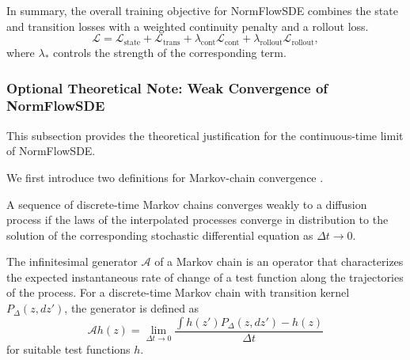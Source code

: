 In summary, the overall training objective for NormFlowSDE combines the state and transition losses with a weighted continuity penalty and a rollout loss.
\begin{equation}\label{eq:normflowsde_loss}
    \mathcal{L}
    =
    \mathcal{L}_{\text{state}} + \mathcal{L}_{\text{trans}}
    + \lambda_{\text{cont}} \mathcal{L}_{\text{cont}} 
    + \lambda_{\text{rollout}} \mathcal{L}_{\text{rollout}},
\end{equation}
where $\lambda_{*}$ controls the strength of the corresponding term.

\subsubsection{Optional Theoretical Note: Weak Convergence of NormFlowSDE}
This subsection provides the theoretical justification for the continuous-time limit of NormFlowSDE.

We first introduce two definitions for Markov-chain convergence \citep{billingsley1999convergence,EthierKurtz1986}.
\begin{definition}
    A sequence of discrete-time Markov chains converges weakly to a diffusion process if the laws of the interpolated processes converge in distribution to the solution of the corresponding stochastic differential equation as $\Delta t \to 0$. 
\end{definition}
\begin{definition}
    The infinitesimal generator $\mathcal{A}$ of a Markov chain is an operator that characterizes the expected instantaneous rate of change of a test function along the trajectories of the process. For a discrete-time Markov chain with transition kernel $P_\Delta(z, dz')$, the generator is defined as
    \begin{equation}
        \mathcal{A}h(z) = \lim_{\Delta t \to 0} \frac{\int h(z') P_\Delta(z, dz') - h(z)}{\Delta t}
    \end{equation}
    for suitable test functions $h$.
\end{definition}

